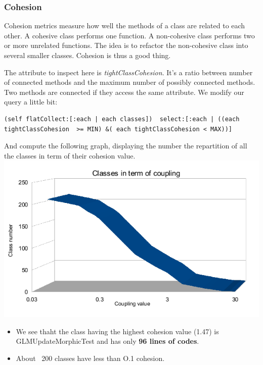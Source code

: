 \documentclass[11pt,a4paper]{article}
\begin{document}
\subsubsection{Cohesion}
Cohesion metrics measure how well the methods of a class are related to each other. A cohesive class performs one function. A non-cohesive class performs two or more unrelated functions. The idea is to refactor the non-cohesive class into several smaller classes. Cohesion is thus a good thing.

The attribute to inspect here is \textit{tightClassCohesion}. It's a ratio between number of connected methods and the maximum number of possibly connected methods. Two methods are connected if they access the same attribute. 
We modify our query a little bit:
\begin{lstlisting}
(self flatCollect:[:each | each classes])  select:[:each | ((each tightClassCohesion  >= MIN) &( each tightClassCohesion < MAX))]
\end{lstlisting}

And compute the following graph, displaying the number the repartition of all the classes in term of their cohesion value.\\
\includegraphics[width=\textwidth]{cohesion_result}

\begin{itemize}
\item We see thaht the class having the highest cohesion value (1.47) is GLMUpdateMorphicTest and has only \textbf{96 lines of codes}.\\

\item About ~200 classes have less than O.1 cohesion. 
\end{itemize}
\end{document}
